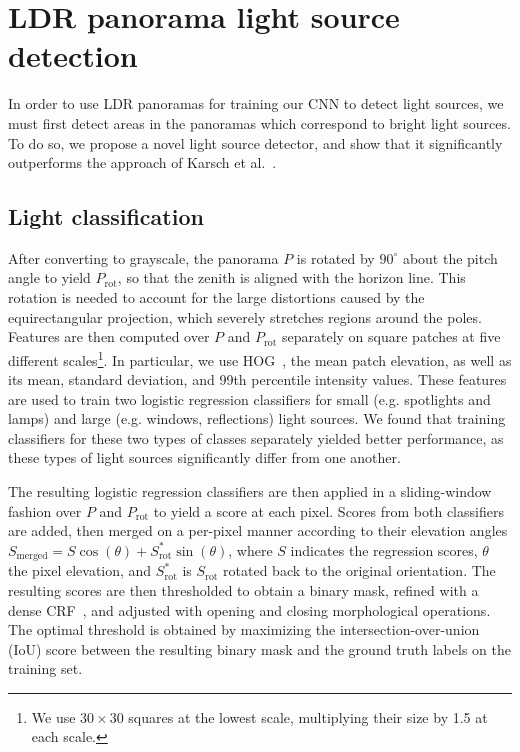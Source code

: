 
\section{LDR panorama light source detection}
\label{sec:lightdetection}

In order to use LDR panoramas for training our CNN to detect light sources, we must first detect areas in the panoramas which correspond to bright light sources. To do so, we propose a novel light source detector, and show that it significantly outperforms the approach of Karsch et al.~. 

\subsection{Light classification} 

After converting to grayscale, the panorama $P$ is rotated by $90^\circ$ about the pitch angle to yield $P_\text{rot}$, so that the zenith is aligned with the horizon line. This rotation is needed to account for the large distortions caused by the equirectangular projection, which severely stretches regions around the poles. Features are then computed over $P$ and $P_\text{rot}$ separately on square patches at five different scales\footnote{We use $30\times30$ squares at the lowest scale, multiplying their size by 1.5 at each scale.}. In particular, we use HOG~\cite{dalal-cvpr-05}, the mean patch elevation, as well as its mean, standard deviation, and 99th percentile intensity values. These features are used to train two logistic regression classifiers for small (e.g. spotlights and lamps) and large (e.g. windows, reflections) light sources. We found that training classifiers for these two types of classes separately yielded better performance, as these types of light sources significantly differ from one another. 

The resulting logistic regression classifiers are then applied in a sliding-window fashion over $P$ and $P_\text{rot}$ to yield a score at each pixel. 
Scores from both classifiers are added, then merged on a per-pixel manner according to their elevation angles $S_\text{merged} = S\cos(\theta) + S_\text{rot}^*\sin(\theta)$, where $S$ indicates the regression scores, $\theta$ the pixel elevation, and $S_\text{rot}^*$ is $S_\text{rot}$ rotated back to the original orientation. The resulting scores are then thresholded to obtain a binary mask, refined with a dense CRF~\cite{krahenbuhl-nips-12}, and adjusted with opening and closing morphological operations. The optimal threshold is obtained by maximizing the intersection-over-union (IoU) score between the resulting binary mask and the ground truth labels on the training set. 

